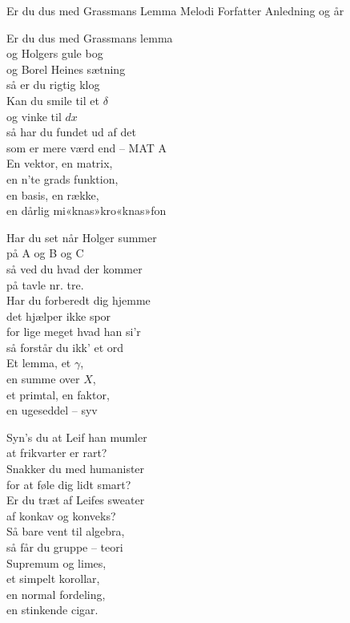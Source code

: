 \begin{song}{Er du dus med Grassmans Lemma}
  {} %
  {Melodi} %
  {Forfatter} %
  {Anledning og år} %
  {\NotCCLIed} %

  \begin{SBVerse}
    Er du dus med Grassmans lemma\\
    og Holgers gule bog\\
    og Borel Heines sætning\\
    så er du rigtig klog\\
    Kan du smile til et $\delta$\\
    og vinke til $dx$\\
    så har du fundet ud af det\\
    som er mere værd end – MAT A\\\medskip
    En vektor, en matrix,\\
    en n’te grads funktion,\\
    en basis, en række,\\
    en dårlig mi«knas»kro«knas»fon
  \end{SBVerse}

  \begin{SBVerse}
    Har du set når Holger summer\\
    på A og B og C\\
    så ved du hvad der kommer\\
    på tavle nr. tre.\\
    Har du forberedt dig hjemme\\
    det hjælper ikke spor\\
    for lige meget hvad han si’r\\
    så forstår du ikk’ et ord\\\medskip
    Et lemma, et $\gamma$,\\
    en summe over $X$,\\
    et primtal, en faktor,\\
    en ugeseddel – syv
  \end{SBVerse}

  \begin{SBVerse}
    Syn’s du at Leif han mumler\\
    at frikvarter er rart?\\
    Snakker du med humanister\\
    for at føle dig lidt smart?\\
    Er du træt af Leifes sweater\\
    af konkav og konveks?\\
    Så bare vent til algebra,\\
    så får du gruppe – teori\\\medskip
    Supremum og limes,\\
    et simpelt korollar,\\
    en normal fordeling,\\
    en stinkende cigar.
  \end{SBVerse}


\end{song}
